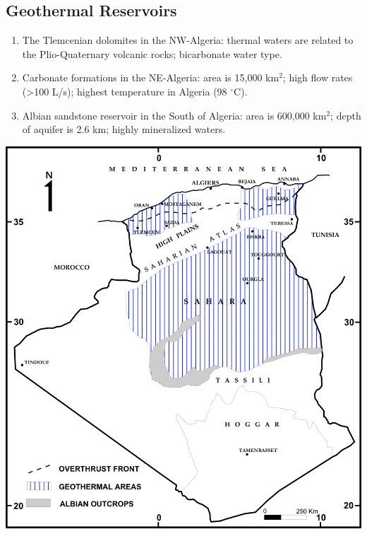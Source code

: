 \documentclass[a0,portrait]{a0poster}
\begin{document}
\begin{multicols}{3}
\subsection*{Geothermal Reservoirs}
\begin{enumerate}
\item The Tlemcenian dolomites in the NW-Algeria: thermal waters are related to the Plio-Quaternary volcanic rocks; bicarbonate water type.
\item Carbonate formations in the NE-Algeria: area is 15,000 km$^2$; high flow rates (\textgreater100 L/s); highest temperature in Algeria (98 $^{\circ}$C). 
\item Albian sandstone reservoir in the South of Algeria: area is 600,000 km$^2$; depth of aquifer is 2.6 km; highly mineralized waters.
\end{enumerate}
\begin{center}\vspace{1cm}
\includegraphics[width=0.8\linewidth]{Figure_4}
\end{center}\vspace{1cm}


\end{multicols}
\end{document}
